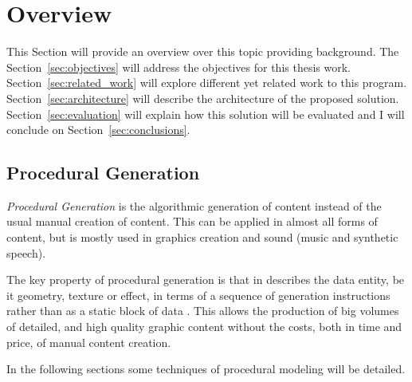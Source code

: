 
% 
% 

\section{Overview} %
\label{sec:overview}


This Section will provide an overview over this topic providing background. The Section~\ref{sec:objectives} will address the objectives for this thesis work. Section~\ref{sec:related_work} will explore different yet related work to this program. Section~\ref{sec:architecture} will describe the architecture of the proposed solution. Section~\ref{sec:evaluation} will explain how this solution will be evaluated and I will conclude on Section~\ref{sec:conclusions}.

\subsection{Procedural Generation} %
\label{sub:procedural_generation}

\emph{Procedural Generation} is the algorithmic generation of content instead of the usual manual creation of content. This can be applied in almost all forms of content, but is mostly used in graphics creation and sound (music and synthetic speech).

The key property of procedural generation is that in describes the data entity, be it geometry, texture or effect, in terms of a sequence of generation instructions rather than as a static block of data \cite{Kelly}. This allows the production of big volumes of detailed, and high quality graphic content without the costs, both in time and price, of manual content creation.

In the following sections some techniques of procedural modeling will be detailed.








